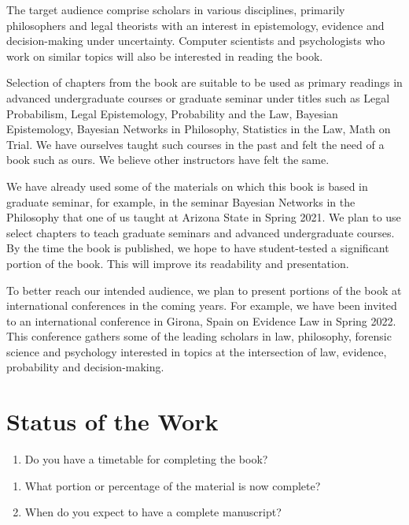 \documentclass[
  10pt,
  dvipsnames,enabledeprecatedfontcommands]{scrartcl}
\providecommand{\tightlist}{%
  \setlength{\itemsep}{0pt}\setlength{\parskip}{0pt}}
\begin{document}
The target audience comprise scholars in various disciplines, primarily
philosophers and legal theorists with an interest in epistemology,
evidence and decision-making under uncertainty. Computer scientists and
psychologists who work on similar topics will also be interested in
reading the book.

Selection of chapters from the book are suitable to be used as primary
readings in advanced undergraduate courses or graduate seminar under
titles such as Legal Probabilism, Legal Epistemology, Probability and
the Law, Bayesian Epistemology, Bayesian Networks in Philosophy,
Statistics in the Law, Math on Trial. We have ourselves taught such
courses in the past and felt the need of a book such as ours. We believe
other instructors have felt the same.

We have already used some of the materials on which this book is based
in graduate seminar, for example, in the seminar Bayesian Networks in
the Philosophy that one of us taught at Arizona State in Spring 2021. We
plan to use select chapters to teach graduate seminars and advanced
undergraduate courses. By the time the book is published, we hope to
have student-tested a significant portion of the book. This will improve
its readability and presentation.

To better reach our intended audience, we plan to present portions of
the book at international conferences in the coming years. For example,
we have been invited to an international conference in Girona, Spain on
Evidence Law in Spring 2022. This conference gathers some of the leading
scholars in law, philosophy, forensic science and psychology interested
in topics at the intersection of law, evidence, probability and
decision-making.

\hypertarget{status-of-the-work}{%
\section{Status of the Work}\label{status-of-the-work}}

\begin{enumerate}
\def\labelenumi{\arabic{enumi}.}
\tightlist
\item
  Do you have a timetable for completing the book?
\end{enumerate}

\begin{enumerate}
\def\labelenumi{\alph{enumi}.}
\item
  What portion or percentage of the material is now complete?
\item
  When do you expect to have a complete manuscript?
\end{enumerate}
\end{document}
